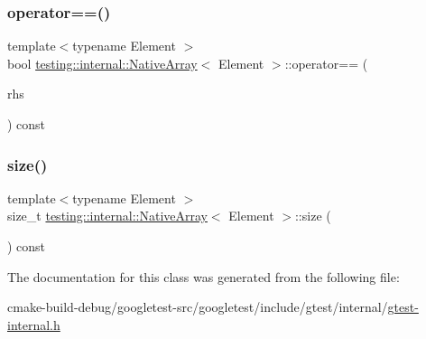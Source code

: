 \mbox{\label{classtesting_1_1internal_1_1NativeArray_a81b90f5739ed812610e68dc34c9e3850}} 
\subsubsection{\texorpdfstring{operator==()}{operator==()}}
{\footnotesize\ttfamily template$<$typename Element $>$ \\
bool \mbox{\hyperlink{classtesting_1_1internal_1_1NativeArray}{testing\+::internal\+::\+Native\+Array}}$<$ Element $>$\+::operator== (\begin{DoxyParamCaption}\item[{const \mbox{\hyperlink{classtesting_1_1internal_1_1NativeArray}{Native\+Array}}$<$ Element $>$ \&}]{rhs }\end{DoxyParamCaption}) const\hspace{0.3cm}{\ttfamily [inline]}}

\mbox{\label{classtesting_1_1internal_1_1NativeArray_af96a4a5ca0cdd5d163c47a081f08bd89}} 
\subsubsection{\texorpdfstring{size()}{size()}}
{\footnotesize\ttfamily template$<$typename Element $>$ \\
size\+\_\+t \mbox{\hyperlink{classtesting_1_1internal_1_1NativeArray}{testing\+::internal\+::\+Native\+Array}}$<$ Element $>$\+::size (\begin{DoxyParamCaption}{ }\end{DoxyParamCaption}) const\hspace{0.3cm}{\ttfamily [inline]}}



The documentation for this class was generated from the following file\+:\begin{DoxyCompactItemize}
\item 
cmake-\/build-\/debug/googletest-\/src/googletest/include/gtest/internal/\mbox{\hyperlink{gtest-internal_8h}{gtest-\/internal.\+h}}\end{DoxyCompactItemize}
